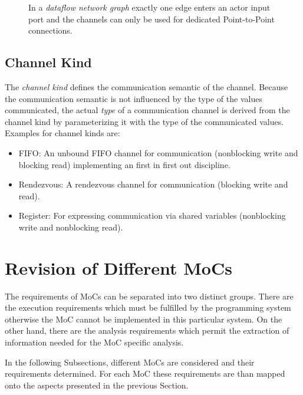 \begin{figure}
\centering

\caption{\label{ng-dataflow}
  In a \emph{dataflow network graph} exactly
  one edge enters an actor input port and
  the channels can only be used for dedicated
  Point-to-Point connections.}
\end{figure}

\subsection{Channel Kind}\label{channel-kind}

The \emph{channel kind} defines the communication semantic of the channel.
Because the communication semantic is not influenced by the
type of the values communicated, the actual \emph{type} of a communication
channel is derived from the channel kind by parameterizing it with
the type of the communicated values. Examples for channel kinds are:

\begin{itemize}
\item \label{channel-kind-fifo} FIFO:
  An unbound FIFO channel for communication
  (nonblocking write and blocking read) implementing
  an first in first out discipline.

\item \label{channel-kind-rendezvous} Rendezvous:
  A rendezvous channel for communication %
  (blocking write and read).

\item \label{channel-kind-register} Register:
  For expressing communication via shared variables
  (nonblocking write and nonblocking read).
\end{itemize}

\section{Revision of Different MoCs}\label{revision-of-mocs}

The requirements of MoCs can be separated into two distinct groups.
There are the execution requirements which must be fulfilled by
the programming system otherwise the MoC cannot be implemented in
this particular system.
On the other hand, there are the analysis requirements which
permit the extraction of information needed for the MoC specific analysis.

In the following Subsections, different MoCs are considered and their
requirements determined. For each MoC these requirements are than
mapped onto the aspects presented in the previous Section.

